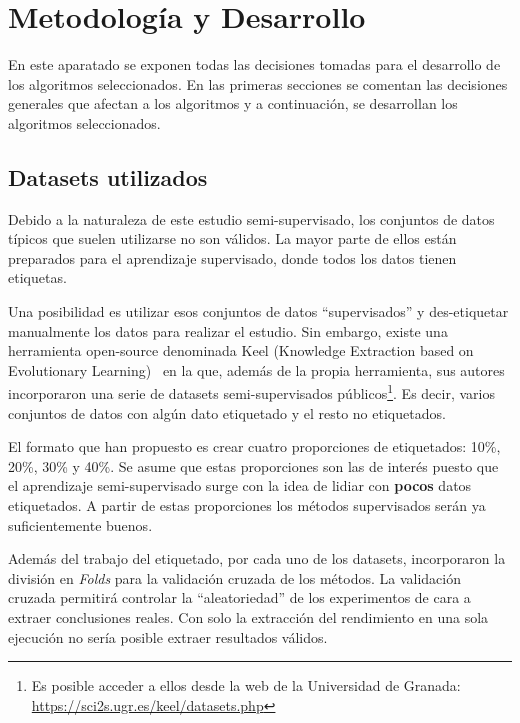 
\cleardoublepage

\chapter{Metodología y Desarrollo}
\label{metodologia}

En este aparatado se exponen todas las decisiones tomadas para el desarrollo de los algoritmos seleccionados. En las primeras secciones se comentan las decisiones generales que afectan a los algoritmos y a continuación, se desarrollan los algoritmos seleccionados.

\section{Datasets utilizados}

Debido a la naturaleza de este estudio semi-supervisado, los conjuntos de datos típicos que suelen utilizarse no son válidos. La mayor parte de ellos están preparados para el aprendizaje supervisado, donde todos los datos tienen etiquetas.

Una posibilidad es utilizar esos conjuntos de datos ``supervisados'' y des-etiquetar manualmente los datos para realizar el estudio. Sin embargo, existe una herramienta open-source denominada Keel (Knowledge Extraction based on Evolutionary Learning)~\cite{derrac2015keel} en la que, además de la propia herramienta, sus autores incorporaron una serie de datasets semi-supervisados públicos\footnote{Es posible acceder a ellos desde la web de la Universidad de Granada: \url{https://sci2s.ugr.es/keel/datasets.php}}. Es decir, varios conjuntos de datos con algún dato etiquetado y el resto no etiquetados.

El formato que han propuesto es crear cuatro proporciones de etiquetados: 10\%, 20\%, 30\% y 40\%. Se asume que estas proporciones son las de interés puesto que el aprendizaje semi-supervisado surge con la idea de lidiar con \textbf{pocos} datos etiquetados. A partir de estas proporciones los métodos supervisados serán ya suficientemente buenos.

Además del trabajo del etiquetado, por cada uno de los datasets, incorporaron la división en \textit{Folds} para la validación cruzada de los métodos. La validación cruzada permitirá controlar la ``aleatoriedad'' de los experimentos de cara a extraer conclusiones reales. Con solo la extracción del rendimiento en una sola ejecución no sería posible extraer resultados válidos.

